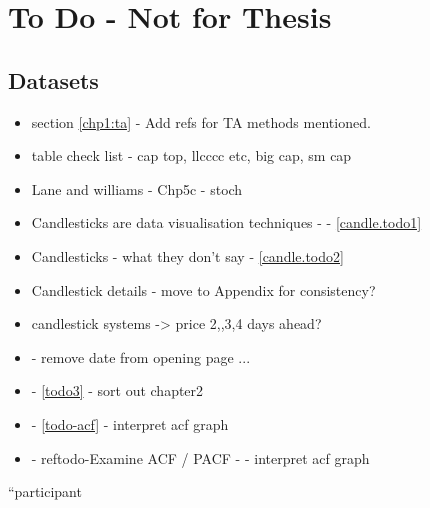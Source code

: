 
\chapter{To Do - Not for Thesis} %

\label{Chapter7} %



\section{Datasets}


\begin{itemize}
\item section \ref{chp1:ta} - Add refs for TA methods mentioned.
\item table check list - cap top, llcccc etc, big cap, sm cap
\item Lane \cite{lane1986using} and williams \cite{williams2011long} \cite{williams1989definitive} - Chp5c - stoch
\item Candlesticks are data visualisation techniques - - \ref{candle.todo1}
\item Candlesticks - what they don't say - \ref{candle.todo2}
\item Candlestick details - move to Appendix for consistency?
\item candlestick systems -> price 2,,3,4 days ahead?
\item - remove date from opening page ...
\item - \ref{todo3} - sort out chapter2
\item - \ref{todo-acf} - interpret acf graph
\item - ref{todo-Examine ACF / PACF} - - interpret acf graph
\end{itemize}


\textquotedblleft participant